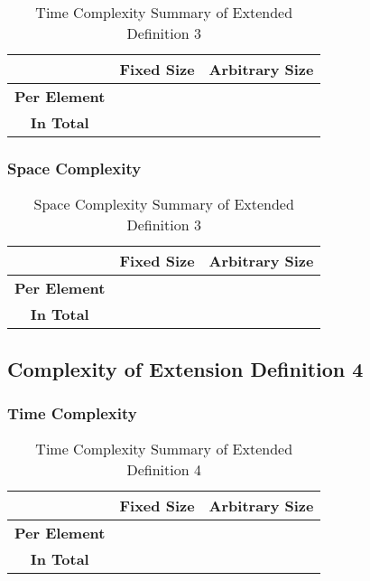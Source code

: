 \documentclass[conference]{IEEEtran}
\begin{document}
\begin{table}[H]
    \centering
    \caption{Time Complexity Summary of Extended Definition 3}
    \begin{tabular}{|c|c|c|}
        \hline
        & \textbf{Fixed Size} & \textbf{Arbitrary Size} \\
        \hline
        \textbf{Per Element} &  &  \\
        \hline
        \textbf{In Total} &  &  \\
        \hline
    \end{tabular}
    \label{tab:time_pn_d03}
\end{table}

\subsubsection{Space Complexity}

\begin{table}[H]
    \centering
    \caption{Space Complexity Summary of Extended Definition 3}
    \begin{tabular}{|c|c|c|}
        \hline
        & \textbf{Fixed Size} & \textbf{Arbitrary Size} \\
        \hline
        \textbf{Per Element} &  &  \\
        \hline
        \textbf{In Total} &  &  \\
        \hline
    \end{tabular}
    \label{tab:space_pn_d03}
\end{table}

\subsection{Complexity of Extension Definition 4}
\label{ca:pn_d04}

\subsubsection{Time Complexity}

\begin{table}[H]
    \centering
    \caption{Time Complexity Summary of Extended Definition 4}
    \begin{tabular}{|c|c|c|}
        \hline
        & \textbf{Fixed Size} & \textbf{Arbitrary Size} \\
        \hline
        \textbf{Per Element} &  &  \\
        \hline
        \textbf{In Total} &  &  \\
        \hline
    \end{tabular}
    \label{tab:time_pn_d04}
\end{table}
\end{document}
